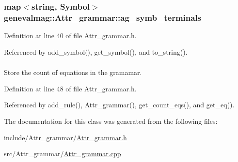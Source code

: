 \hypertarget{classgenevalmag_1_1Attr__grammar_aae56008f83f809143d7f157a7281831d}{
\subsubsection[{ag\_\-symb\_\-terminals}]{\setlength{\rightskip}{0pt plus 5cm}map$<$string, {\bf Symbol}$>$ {\bf genevalmag::Attr\_\-grammar::ag\_\-symb\_\-terminals}}}
\label{classgenevalmag_1_1Attr__grammar_aae56008f83f809143d7f157a7281831d}


Definition at line 40 of file Attr\_\-grammar.h.



Referenced by add\_\-symbol(), get\_\-symbol(), and to\_\-string().

\hypertarget{classgenevalmag_1_1Attr__grammar_a127f4869156cd76ee3381b19d8c7cc9a}{
\subsubsection[{count\_\-eqs}]{}}
\label{classgenevalmag_1_1Attr__grammar_a127f4869156cd76ee3381b19d8c7cc9a}


Store the count of equations in the gramamar. 



Definition at line 48 of file Attr\_\-grammar.h.



Referenced by add\_\-rule(), Attr\_\-grammar(), get\_\-count\_\-eqs(), and get\_\-eq().



The documentation for this class was generated from the following files:\begin{DoxyCompactItemize}
\item 
include/Attr\_\-grammar/\hyperlink{Attr__grammar_8h}{Attr\_\-grammar.h}\item 
src/Attr\_\-grammar/\hyperlink{Attr__grammar_8cpp}{Attr\_\-grammar.cpp}\end{DoxyCompactItemize}
